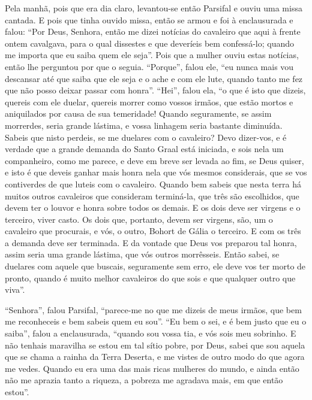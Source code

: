 Pela manhã, pois que era dia claro, levantou-se então Parsifal e ouviu uma
missa cantada. E pois que tinha ouvido missa, então se armou e foi à
enclausurada e falou: “Por Deus, Senhora, então me dizei notícias do cavaleiro
que aqui à frente ontem cavalgava, para o qual dissestes  e que deveríeis bem
confessá-lo; quando me importa que eu saiba quem ele seja”. Pois que a mulher
ouviu estas notícias, então lhe perguntou por que o seguia. “Porque”, falou
ele, “eu nunca mais vou descansar até que saiba que ele seja e o ache e com ele
lute, quando tanto me fez que não posso deixar passar com honra”. “Hei”, falou
ela, “o que é isto que dizeis, quereis com ele duelar, quereis morrer como
vossos irmãos, que estão mortos e aniquilados por causa de sua temeridade!
Quando seguramente, se assim morrerdes, seria grande lástima, e vossa linhagem
seria bastante diminuída. Sabeis  que nisto perdeis, se me duelares
com o cavaleiro? Devo dizer-vos,  e é verdade que a grande demanda do Santo
Graal está iniciada, e sois nela um companheiro, como me parece, e deve em
breve ser levada ao fim, se Deus quiser, e isto é que deveis ganhar mais honra
nela que vós mesmos considerais, que se vos contiverdes de que luteis com o
cavaleiro. Quando bem sabeis que nesta terra há muitos outros cavaleiros que
consideram terminá-la, que três são escolhidos, que devem ter o louvor e honra
sobre todos os demais. E os dois deve ser virgens e o terceiro, viver casto. Os
dois que, portanto, devem ser virgens, são, um o cavaleiro que procurais, e
vós, o outro, Bohort de Gália o terceiro. E com os três a demanda deve ser
terminada. E da vontade que Deus vos preparou tal honra, assim seria uma grande
lástima, que vós outros morrêsseis. Então sabei, se duelares com aquele que
buscais, seguramente sem erro, ele deve vos ter morto de pronto, quando é muito
melhor cavaleiros do que sois e que qualquer outro que viva”. 

“Senhora”, falou Parsifal, “parece-me no que me dizeis de meus irmãos, que
bem me reconheceis e bem sabeis quem eu sou”. “Eu bem o sei, e é bem justo que
eu o saiba”, falou a enclausurada, “quando sou vossa tia, e vós sois meu
sobrinho. E não tenhais maravilha se estou em tal sítio pobre, por Deus, sabei
que sou aquela que se chama a rainha da Terra Deserta, e me vistes de outro
modo do que agora me vedes. Quando eu era uma das mais ricas mulheres do mundo,
e ainda então não me aprazia tanto a riqueza, a pobreza me agradava mais, em
que então estou”. 


